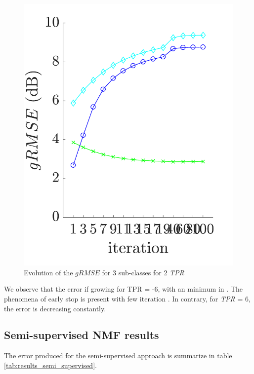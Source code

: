 \documentclass[twocolumn,a4paper,10pt]{article}
\begin{document}
\begin{figure}[!t]
\begin{minipage}[t]{.24\textwidth}
		\includegraphics[width=\linewidth]{../image/AmbianceNmfSupervised_EarlyStop_TPR-6.pdf} 
	\end{minipage}
	\caption{Evolution of the $gRMSE$ for 3 sub-classes for 2 \textit{TPR}}
	\label{fig:RMSEevolution}
\end{figure}

We observe that the error if growing for TPR = -6, with an minimum in . The phenomena of early stop is present with few iteration . 
In contrary, for \textit{TPR} = 6, the  error is decreasing constantly. 

\subsection{Semi-supervised NMF results}
The error produced for the semi-supervised approach is summarize in table \ref{tab:results_semi_supervised}.
\end{document}
